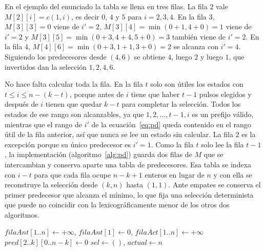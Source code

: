 En el ejemplo del enunciado la tabla se llena en tres filas. La fila $2$ vale $M[2][i] = c(1,i)$, es decir $0$, $4$ y $5$ para $i = 2, 3, 4$. En la fila $3$, $M[3][3] = 0$ viene de $i' = 2$, $M[3][4] = \min(0 + 1, 4 + 0) = 1$ viene de $i' = 2$ y $M[3][5] = \min(0 + 3, 4 + 4, 5 + 0) = 3$ también viene de $i' = 2$. En la fila $4$, $M[4][6] = \min(0 + 3, 1 + 1, 3 + 0) = 2$ se alcanza con $i' = 4$. Siguiendo los predecesores desde $(4, 6)$ se obtiene $4$, luego $2$ y luego $1$, que invertidos dan la selección $1, 2, 4, 6$.

No hace falta calcular toda la fila. En la fila $t$ solo son útiles los estados con $t \le i \le n - (k - t)$, porque antes de $i$ tiene que haber $t-1$ pulsos elegidos y después de $i$ tienen que quedar $k - t$ para completar la selección. Todos los estados de ese rango son alcanzables, ya que $1, 2, \ldots, t-1, i$ es un prefijo válido, mientras que el rango de $i'$ de la ecuación~\eqref{eq:pd} queda contenido en el rango útil de la fila anterior, así que nunca se lee un estado sin calcular. La fila $2$ es la excepción porque su único predecesor es $i' = 1$. Como la fila $t$ solo lee la fila $t-1$, la implementación (algoritmo~\ref{alg:pd}) guarda dos filas de $M$ que se intercambian y conserva aparte una tabla de predecesores. Esa tabla se indexa con $i - t$ para que cada fila ocupe $n - k + 1$ enteros en lugar de $n$ y con ella se reconstruye la selección desde $(k, n)$ hasta $(1, 1)$. Ante empates se conserva el primer predecesor que alcanza el mínimo, lo que fija una selección determinista que puede no coincidir con la lexicográficamente menor de los otros dos algoritmos.

\begin{algorithm}[htbp]
\caption{Programación dinámica con reconstrucción}
\label{alg:pd}
$\mathit{filaAnt}[1..n] \gets +\infty$, $\mathit{filaAnt}[1] \gets 0$, $\mathit{filaAct}[1..n] \gets +\infty$\;
$\mathit{pred}[2..k][0..n-k] \gets 0$\;
$\mathit{sel} \gets ()$, $\mathit{actual} \gets n$\;
\end{algorithm}

